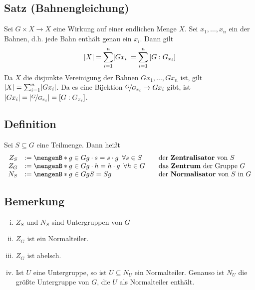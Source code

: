 \subsection{Satz (Bahnengleichung)} %
\label{sub:310}\hypertarget{bahnengleichung}{ }
Sei $G \times X \to X$ eine Wirkung auf einer endlichen Menge $X$. Sei $x_1, \ldots ,x_n$ ein  der Bahnen, d.h. jede Bahn enthält genau ein $x_i$. Dann gilt
\[
	\lvert X\rvert = \sum_{i=1}^{n} \lvert Gx_i\rvert= \sum_{i=1}^{n} \left[G:G_{x_i}\right]  
\]
Da $X$ die disjunkte Vereinigung der Bahnen $Gx_1, \ldots , Gx_n$ ist, gilt $\lvert X\rvert = \sum_{i=1}^{n} \lvert Gx_i\rvert  $. Da es eine Bijektion $\nicefrac{G}{G_{x_i}} \to Gx_i$
gibt, ist $\lvert Gx_i\rvert = \lvert\nicefrac{G}{G_{x_i}}\rvert = \left[ G : G_{x_i} \right]  $. \bewende

\subsection[Definition: Zentralisator, Zentrum und Normalisator]{Definition} %
\label{sub:311}
Sei $S \subseteq G$ eine Teilmenge. Dann heißt 
\[
	\begin{array}{rll}
	Z_S &:= \set[g \in G]{g \cdot s=s \cdot g \enspace\forall s \in S} & \quad \text{der \Index{Zentralisator} von $S$}\\
	Z_G &:= \set[g \in G]{g \cdot h = h \cdot g \enspace\forall h \in G} & \quad \text{das \Index{Zentrum} der Gruppe $G$}\\
	N_S &:= \set[g \in G]{gS=Sg} & \quad \text{der \Index{Normalisator} von $S$ in $G$}
\end{array}
\]

\subsection[Bemerkung: Eigenschaften von von Zentralisator, Normalisator und Zentrum]{Bemerkung} %
\label{sub:312}
\begin{enumerate}[(i)]
	\item $Z_S$ und $N_S$ sind Untergruppen von $G$
	\item $Z_G$ ist ein Normalteiler.
	\item $Z_G$ ist abelsch.
	\item Ist $U$ eine Untergruppe, so ist $U \subseteq N_U$ ein Normalteiler. Genauso ist $N_U$ die größte Untergruppe von $G$, die $U$ als Normalteiler enthält.
\end{enumerate}

